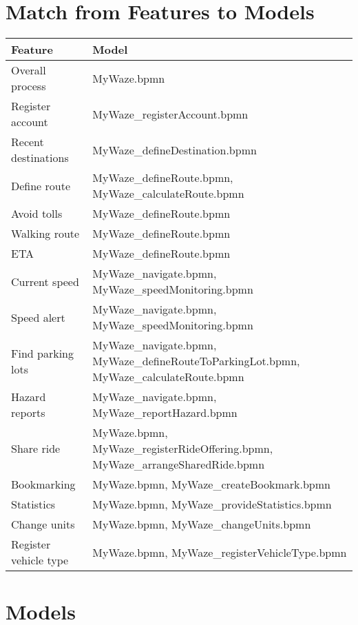 \documentclass{article}
\begin{document}
\section*{Match from Features to Models}

\begin{longtable}{|>{\raggedright}p{}|>{\raggedright\arraybackslash}p{}|}
\hline
\textbf{Feature} & \textbf{Model} \\
\hline
Overall process & MyWaze.bpmn \\
\hline
Register account & MyWaze\_registerAccount.bpmn \\
\hline
Recent destinations & MyWaze\_defineDestination.bpmn \\
\hline
Define route & MyWaze\_defineRoute.bpmn, MyWaze\_calculateRoute.bpmn \\
\hline
Avoid tolls & MyWaze\_defineRoute.bpmn \\
\hline
Walking route & MyWaze\_defineRoute.bpmn \\
\hline
ETA & MyWaze\_defineRoute.bpmn \\
\hline
Current speed & MyWaze\_navigate.bpmn, MyWaze\_speedMonitoring.bpmn \\
\hline
Speed alert & MyWaze\_navigate.bpmn, MyWaze\_speedMonitoring.bpmn \\
\hline
Find parking lots & MyWaze\_navigate.bpmn, MyWaze\_defineRouteToParkingLot.bpmn, MyWaze\_calculateRoute.bpmn \\
\hline
Hazard reports & MyWaze\_navigate.bpmn, MyWaze\_reportHazard.bpmn \\
\hline
Share ride & MyWaze.bpmn, MyWaze\_registerRideOffering.bpmn, MyWaze\_arrangeSharedRide.bpmn \\
\hline
Bookmarking & MyWaze.bpmn, MyWaze\_createBookmark.bpmn \\
\hline
Statistics & MyWaze.bpmn, MyWaze\_provideStatistics.bpmn \\
\hline
Change units & MyWaze.bpmn, MyWaze\_changeUnits.bpmn \\
\hline
Register vehicle type & MyWaze.bpmn, MyWaze\_registerVehicleType.bpmn \\
\hline
\end{longtable}

\section*{Models}

\end{document}
